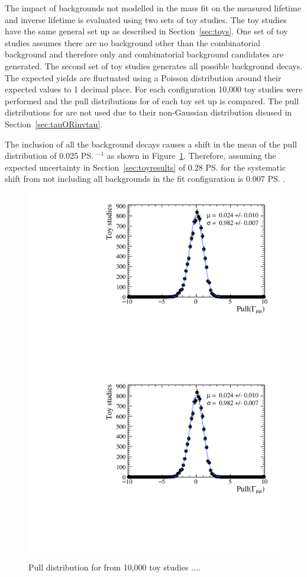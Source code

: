 The impact of backgrounds not modelled in the mass fit on the measured lifetime and inverse lifetime is evaluated using two sets of toy studies. The toy studies have the same general set up as described in Section~\ref{sec:toys}. One set of toy studies assumes there are no background other than the combinatorial background and therefore only \bsmumu and combinatorial background candidates are generated. The second set of toy studies generates all possible background decays. The expected yields are fluctuated using a Poisson distribution around their expected values to 1 decimal place. For each configuration 10,000 toy studies were performed and the pull distributions for \Gmumu of each toy set up is compared. The pull distributions for \tmumu are not used due to their non-Gaussian distribution disused in Section~\ref{sec:tauORinvtau}. 

The inclusion of all the background decays causes a shift in the mean of the \Gmumu pull distribution of 0.025 \ps$^{-1}$ as shown in Figure~\ref{fig:bkdcontam}. Therefore, assuming the expected uncertainty in Section~\ref{sec:toyresults} of 0.28 \ps for \tmumu the systematic shift from not including all backgrounds in the fit configuration is 0.007 \ps.%

\begin{figure}[htbp]
    \centering
        \includegraphics[width=0.49 \textwidth]{./Figs/LifetimeSystematics/5320_all_bkgnds_gamma_pull_CKM.pdf}
        \includegraphics[width=0.49 \textwidth]{./Figs/LifetimeSystematics/5320_all_bkgnds_gamma_pull_CKM.pdf}
    \caption{Pull distribution for \Gmumu from 10,000 toy studies ....}
    \label{fig:bkdcontam}
\end{figure}

